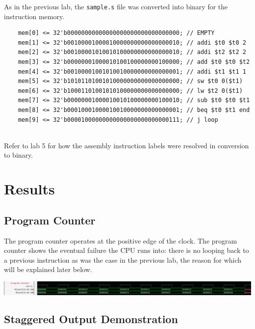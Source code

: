 \documentclass[twocolumn]{article}
\newcommand{\cc}[1]{\texttt{#1}}
\begin{document}
As in the previous lab, the \cc{sample.s} file was converted into binary for the instruction memory. \\


\begin{lstlisting}
    mem[0] <= 32'b00000000000000000000000000000000; // EMPTY
    mem[1] <= 32'b00100001000010000000000000000010; // addi $t0 $t0 2
    mem[2] <= 32'b00100001010010100000000000000010; // addi $t2 $t2 2
    mem[3] <= 32'b00000001000010100100000000100000; // add $t0 $t0 $t2
    mem[4] <= 32'b00100001001010010000000000000001; // addi $t1 $t1 1
    mem[5] <= 32'b10101101001010000000000000000000; // sw $t0 0($t1)
    mem[6] <= 32'b10001101001010100000000000000000; // lw $t2 0($t1)
    mem[7] <= 32'b00000001000010010100000000100010; // sub $t0 $t0 $t1
    mem[8] <= 32'b00010001000010010000000000000001; // beq $t0 $t1 end
    mem[9] <= 32'b00001000000000000000000000000111; // j loop
\end{lstlisting}
\\

Refer to lab 5 for how the assembly instruction labels were resolved in conversion to binary.

\newpage

\section{Results}

\subsection{Program Counter}

The program counter operates at the positive edge of the clock. The program counter shows the eventual failure the CPU runs into: there is no looping back to a previous instruction as was the case in the previous lab, the reason for which will be explained later below.

\begingroup
    \centering
    \medskip
    \includegraphics[width=\columnwidth]{Lab-Tex/Lab6-images/p1.png}
    \medskip
\endgroup

\subsection{Staggered Output Demonstration}
\end{document}
